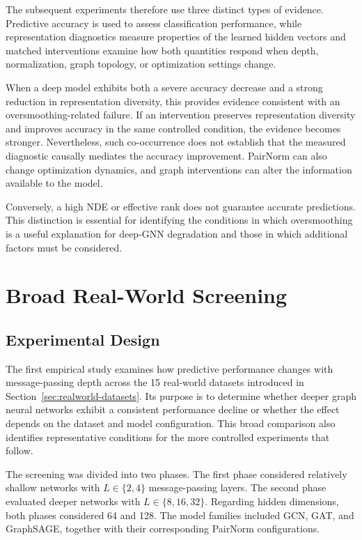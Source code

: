 \documentclass[english]{lni}
\begin{document}
The subsequent experiments therefore use three distinct types of evidence. Predictive accuracy is used to assess classification performance, while representation diagnostics measure properties of the learned hidden vectors and matched interventions examine how both quantities respond when depth, normalization, graph topology, or optimization settings change.

When a deep model exhibits both a severe accuracy decrease and a strong reduction in representation diversity, this provides evidence consistent with an oversmoothing-related failure. If an intervention preserves representation diversity and improves accuracy in the same controlled condition, the evidence becomes stronger. Nevertheless, such co-occurrence does not establish that the measured diagnostic causally mediates the accuracy improvement. PairNorm can also change optimization dynamics, and graph interventions can alter the information available to the model.

Conversely, a high NDE or effective rank does not guarantee accurate predictions. This distinction is essential for identifying the conditions in which oversmoothing is a useful explanation for deep-GNN degradation and those in which additional factors must be considered.




\section{Broad Real-World Screening}
\label{sec:broad-screening}

\subsection{Experimental Design}
\label{sec:broad-screening-design}

The first empirical study examines how predictive performance changes with message-passing depth across the 15 real-world datasets introduced in Section~\ref{sec:realworld-datasets}. Its purpose is to determine whether deeper graph neural networks exhibit a consistent performance decline or whether the effect depends on the dataset and model configuration. This broad comparison also identifies representative conditions for the more controlled experiments that follow.

The screening was divided into two phases. The first phase considered relatively shallow networks with $L\in\{2,4\}$ message-passing layers. The second phase evaluated deeper networks with $L\in\{8,16,32\}$. Regarding hidden dimensions, both phases considered 64 and 128. The model families included GCN, GAT, and GraphSAGE, together with their corresponding PairNorm configurations.
\end{document}
